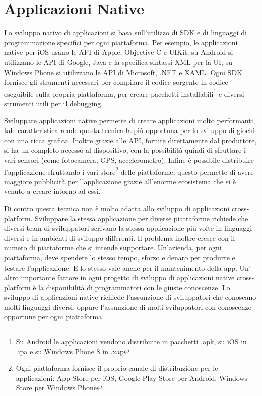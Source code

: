 	\section{Applicazioni Native}
		Lo sviluppo nativo di applicazioni si basa sull'utilizzo di SDK e di 
		linguaggi di programmazione specifici per ogni piattaforma. Per esempio, 
		le applicazioni native per iOS usano le API di Apple, Objective C e 
		UIKit; su Android si utilizzano le API di Google, Java e la specifica 
		sintassi XML per la UI; su Windows Phone si utilizzano le API di 
		Microsoft, .NET e XAML. Ogni SDK fornisce gli strumenti necessari per 
		compilare il codice sorgente in codice eseguibile sulla propria 
		piattaforma, per creare pacchetti installabili\footnote{Su Android le 
		applicazioni vendono distribuite in pacchetti .apk, su iOS in .ipa e su 
		Windows Phone 8 in .xap} e diversi strumenti utili per il debugging.

		Sviluppare applicazioni native permette di creare applicazioni molto 
		performanti, tale caratteristica rende questa tecnica la più opportuna 
		per lo sviluppo di giochi con una ricca grafica. Inoltre grazie alle 
		API, fornite direttamente dal produttore, si ha un completo accesso al 
		dispositivo, con la possibilità quindi di sfruttare i vari sensori 
		(come fotocamera, GPS, accelerometro). Infine è possibile distribuire 
		l'applicazione sfruttando i vari store\footnote{Ogni piattaforma 
		fornisce il proprio canale di distribuzione per le applicazioni: 
		App Store per iOS, Google Play Store per Android, Windows Store per 
		Windows Phone} delle piattaforme, questo permette di avere maggiore 
		pubblicità per l'applicazione grazie all'enorme ecosistema che si è 
		venuto a creare intorno ad essi.

		Di contro questa tecnica non è molto adatta allo sviluppo di 
		applicazioni cross-platform. Sviluppare la stessa applicazione per 
		diverse piattaforme richiede che diversi team di sviluppatori scrivano 
		la stessa applicazione più volte in linguaggi diversi e in ambienti di 
		sviluppo differenti. Il problema inoltre cresce con il numero di 
		piattaforme che si intende supportare. Un'azienda, per ogni piattaforma, 
		deve spendere lo stesso tempo, sforzo e denaro per produrre e testare 
		l'applicazione. E lo stesso vale anche per il mantenimento della app. 
		Un' altro importante fattore in ogni progetto di sviluppo di 
		applicazioni native cross-platform è la disponibilità di programmatori 
		con le giuste conoscenze. Lo sviluppo di applicazioni native richiede 
		l'assunzione di sviluppatori che conoscano molti linguaggi diversi, 
		oppure l'assunzione di molti sviluppatori con conoscenze opportune per 
		ogni piattaforma.
		
